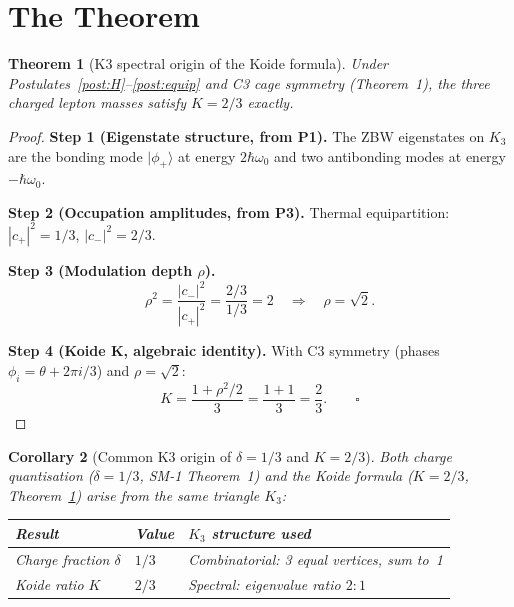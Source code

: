 \documentclass[11pt]{article}
\newtheorem{theorem}{Theorem}[section]
\newtheorem{corollary}[theorem]{Corollary}
\begin{document}
\section{The Theorem}

\begin{theorem}[K3 spectral origin of the Koide formula]
\label{thm:K3Koide}
Under Postulates~\ref{post:H}--\ref{post:equip} and C3 cage symmetry
(Theorem~1), the three charged lepton masses satisfy $K = 2/3$ exactly.
\end{theorem}

\begin{proof}
\textbf{Step 1 (Eigenstate structure, from P1).}
The ZBW eigenstates on $K_3$ are the bonding mode $|\phi_+\rangle$ at
energy $2\hbar\omega_0$ and two antibonding modes at energy $-\hbar\omega_0$.

\textbf{Step 2 (Occupation amplitudes, from P3).}
Thermal equipartition: $|c_+|^2 = 1/3$, $|c_-|^2 = 2/3$.

\textbf{Step 3 (Modulation depth $\rho$).}
\[
\rho^2 = \frac{|c_-|^2}{|c_+|^2} = \frac{2/3}{1/3} = 2
\quad\Rightarrow\quad \rho = \sqrt{2}.
\]

\textbf{Step 4 (Koide K, algebraic identity).}
With C3 symmetry (phases $\phi_i = \theta + 2\pi i/3$) and
$\rho = \sqrt{2}$:
\[
K = \frac{1 + \rho^2/2}{3} = \frac{1 + 1}{3} = \frac{2}{3}.\qquad\square
\]
\end{proof}

\begin{corollary}[Common K3 origin of $\delta = 1/3$ and $K = 2/3$]
\label{cor:common}
Both charge quantisation ($\delta = 1/3$, SM-1 Theorem~1) and the
Koide formula ($K = 2/3$, Theorem~\ref{thm:K3Koide}) arise from the
same triangle $K_3$:
\begin{center}
\begin{tabular}{lll}
\toprule
Result & Value & $K_3$ structure used \\
\midrule
Charge fraction $\delta$ & $1/3$ & Combinatorial: 3 equal vertices, sum to~1 \\
Koide ratio $K$ & $2/3$ & Spectral: eigenvalue ratio $2:1$ \\
\bottomrule
\end{tabular}
\end{center}
\end{corollary}

\end{document}
